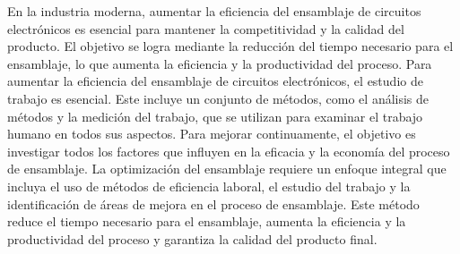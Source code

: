     En la industria moderna, aumentar la eficiencia del ensamblaje de circuitos electrónicos es esencial para mantener la competitividad y la calidad del producto. El objetivo se logra mediante la reducción del tiempo necesario para el ensamblaje, lo que aumenta la eficiencia y la productividad del proceso.
        Para aumentar la eficiencia del ensamblaje de circuitos electrónicos, el estudio de trabajo es esencial. Este incluye un conjunto de métodos, como el análisis de métodos y la medición del trabajo, que se utilizan para examinar el trabajo humano en todos sus aspectos. Para mejorar continuamente, el objetivo es investigar todos los factores que influyen en la eficacia y la economía del proceso de ensamblaje.\cite{estudio_del_trabajo}
        La optimización del ensamblaje requiere un enfoque integral que incluya el uso de métodos de eficiencia laboral, el estudio del trabajo y la identificación de áreas de mejora en el proceso de ensamblaje. Este método reduce el tiempo necesario para el ensamblaje, aumenta la eficiencia y la productividad del proceso y garantiza la calidad del producto final.
        \cite{freivalds2014ingenieria}
